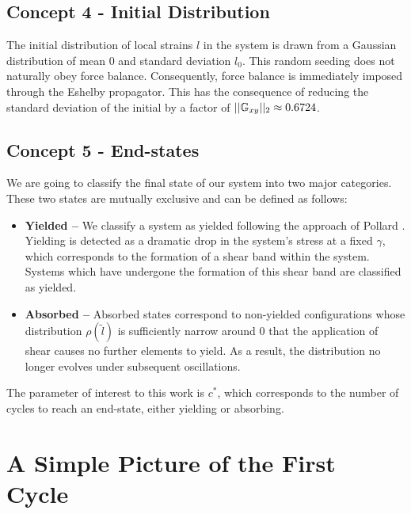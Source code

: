 \subsection{Concept 4 - Initial Distribution}
The initial distribution of local strains $l$ in the system is drawn from a Gaussian distribution of mean $0$ and standard deviation $l_0$. This random seeding does not naturally obey force balance. Consequently, force balance is immediately imposed through the Eshelby propagator. This has the consequence of reducing the standard deviation of the initial by a factor of $||\mathbb{G}_{xy}||_2\approx0.6724$.

\subsection{Concept 5 - End-states}
We are going to classify the final state of our system into two major categories. These two states are mutually exclusive and can be defined as follows:
\begin{itemize}
    \item {\bf Yielded –} We classify a system as yielded following the approach of Pollard \etal \cite{pollard_yielding_2022}. Yielding is detected as a dramatic drop in the system's stress at a fixed $\gamma$, which corresponds to the formation of a shear band within the system. Systems which have undergone the formation of this shear band are classified as yielded.
    \item {\bf Absorbed –} Absorbed states correspond to non-yielded configurations whose distribution $\rho(\tilde l)$ is sufficiently narrow around $0$ that the application of shear causes no further elements to yield. As a result, the distribution no longer evolves under subsequent oscillations.
\end{itemize}
The parameter of interest to this work is $c^*$, which corresponds to the number of cycles to reach an end-state, either yielding or absorbing.

\section{A Simple Picture of the First Cycle} \label{sec:simpleFirstCycle}


